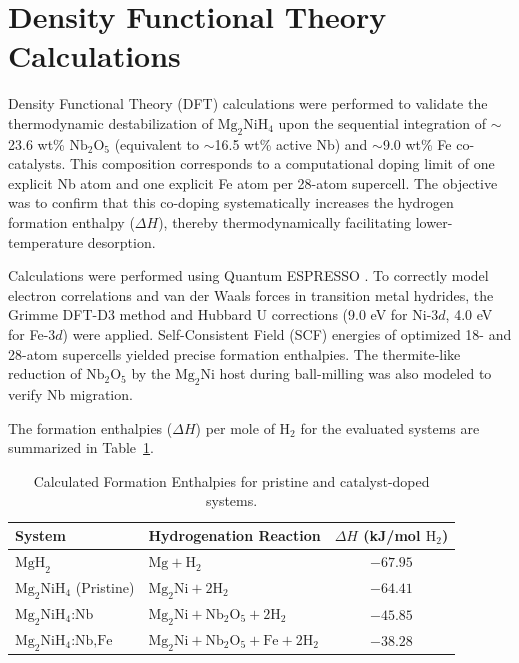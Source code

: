 \documentclass[12pt,a4paper]{article}
\begin{document}
\section{Density Functional Theory Calculations}

Density Functional Theory (DFT) calculations were performed to validate the thermodynamic destabilization of $\text{Mg}_2\text{NiH}_4$ upon the sequential integration of $\sim$23.6 wt\% $\text{Nb}_2\text{O}_5$ (equivalent to $\sim$16.5 wt\% active Nb) and $\sim$9.0 wt\% Fe co-catalysts. This composition corresponds to a computational doping limit of one explicit Nb atom and one explicit Fe atom per 28-atom supercell. The objective was to confirm that this co-doping systematically increases the hydrogen formation enthalpy ($\Delta H$), thereby thermodynamically facilitating lower-temperature desorption.

Calculations were performed using Quantum ESPRESSO \cite{giannozzi2009quantum}. To correctly model electron correlations and van der Waals forces in transition metal hydrides, the Grimme DFT-D3 method \cite{grimme2010consistent} and Hubbard U corrections (9.0 eV for Ni-$3d$, 4.0 eV for Fe-$3d$) \cite{cococcioni2005linear} were applied. Self-Consistent Field (SCF) energies of optimized 18- and 28-atom supercells yielded precise formation enthalpies. The thermite-like reduction of $\text{Nb}_2\text{O}_5$ by the $\text{Mg}_2\text{Ni}$ host during ball-milling was also modeled to verify Nb migration.

The formation enthalpies ($\Delta H$) per mole of $\text{H}_2$ for the evaluated systems are summarized in Table~\ref{tab:enthalpies}.

\begin{table}[h]
    \centering
    \caption{Calculated Formation Enthalpies for pristine and catalyst-doped systems.}
    \vspace{0.2cm}
    \begin{tabular}{llc}
        \toprule
        \textbf{System} & \textbf{Hydrogenation Reaction} & \textbf{$\Delta H$ (kJ/mol $\text{H}_2$)} \\
        \midrule
        $\text{MgH}_2$ & $\text{Mg} + \text{H}_2$ & $-67.95$ \\
        $\text{Mg}_2\text{NiH}_4$ (Pristine) & $\text{Mg}_2\text{Ni} + 2\text{H}_2$ & $-64.41$ \\
        $\text{Mg}_2\text{NiH}_4\text{:Nb}$ & $\text{Mg}_2\text{Ni} + \text{Nb}_2\text{O}_5 + 2\text{H}_2$ & $-45.85$ \\
        $\text{Mg}_2\text{NiH}_4\text{:Nb,Fe}$ & $\text{Mg}_2\text{Ni} + \text{Nb}_2\text{O}_5 + \text{Fe} + 2\text{H}_2$ & $-38.28$ \\
        \bottomrule
    \end{tabular}
    \label{tab:enthalpies}
\end{table}
\end{document}
